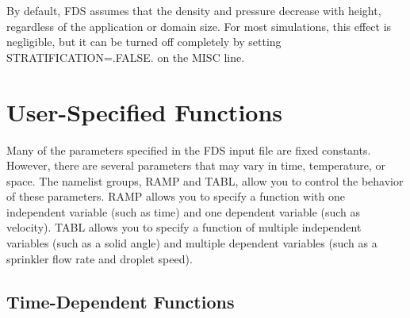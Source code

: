 \documentclass[11pt]{book}
\begin{document}
By default, FDS assumes that the density and pressure decrease with height, regardless of the
application or domain size. For most simulations, this effect is negligible, but it can be
turned off completely by setting {\ct STRATIFICATION=.FALSE.} on the {\ct MISC} line.


\chapter{User-Specified Functions}
\label{info:RAMP}

Many of the parameters specified in the FDS input file are fixed constants. However, there are several parameters that may vary in
time, temperature, or space. The namelist groups,
{\ct RAMP} and {\ct TABL}, allow you to control the behavior of these parameters.  {\ct RAMP} allows you
to specify a function with one independent variable (such as time) and one dependent variable (such as velocity).
{\ct TABL} allows you to specify a function of multiple independent variables (such as a solid angle) and multiple
dependent variables (such as a sprinkler flow rate and droplet speed).



\section{Time-Dependent Functions}
\label{info:RAMP_Time}
\end{document}

